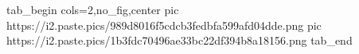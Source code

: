  
 
 
 
 


\ifcmt
  tab_begin cols=2,no_fig,center
		 pic https://i2.paste.pics/989d8016f5cdcb3fedbfa599afd04dde.png
     pic https://i2.paste.pics/1b3fdc70496ae33bc22df394b8a18156.png
  tab_end
\fi
